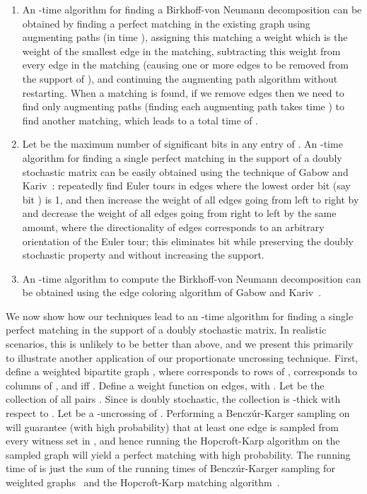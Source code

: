 \documentclass[11pt]{article}
\begin{document}
\begin{enumerate}
\item An -time algorithm for finding a Birkhoff-von Neumann
  decomposition can be obtained by finding a perfect matching in the existing
  graph using augmenting paths (in time ), assigning this matching a
  weight which is the weight of the smallest edge in the matching, subtracting
  this weight from every edge in the matching (causing one or more edges to be
  removed from the support of ), and continuing the augmenting path
  algorithm without restarting. When a matching is found, if we remove 
  edges then we need to find only  augmenting paths (finding each
  augmenting path takes time ) to find another matching, which leads to
  a total time of .
\item Let  be the maximum number of significant bits in any entry of
  . An -time algorithm for finding a single perfect matching in the
  support of a doubly stochastic matrix can be easily obtained using the
  technique of Gabow and Kariv~\cite{gk:edge1982}: repeatedly find Euler tours
  in edges where the lowest order bit (say bit ) is 1, and then increase
  the weight of all edges going from left to right by  and decrease
  the weight of all edges going from right to left by the same amount, where
  the directionality of edges corresponds to an arbitrary orientation of the
  Euler tour; this eliminates bit  while preserving the doubly stochastic
  property and without increasing the support.
\item An -time algorithm to compute the Birkhoff-von Neumann
  decomposition can be obtained using the edge coloring algorithm of Gabow and
  Kariv~\cite{gk:edge1982}.
\end{enumerate}

We now show how our techniques lead to an -time
algorithm for finding a single perfect matching in the support of a doubly
stochastic matrix. In realistic scenarios, this is unlikely to be better than
 above, and we present this primarily to illustrate another application
of our proportionate uncrossing technique. First, define a weighted bipartite
graph , where  corresponds to rows of
,  corresponds to columns of , and
 iff . Define a weight function  on edges,
with . Let  be the collection of all pairs
. Since  is doubly
stochastic, the collection  is -thick with respect to . Let  be a -uncrossing of . Performing a
Bencz\'{u}r-Karger sampling on  will guarantee (with high probability) that at
least one edge is sampled from every witness set in , and hence
running the Hopcroft-Karp algorithm on the sampled graph will yield a perfect
matching with high probability. The running time of  is just the sum of the running times of Bencz\'{u}r-Karger sampling for
weighted graphs~\cite{benczurkarger96} and the Hopcroft-Karp matching
algorithm~\cite{hk:match73}.
\end{document}
